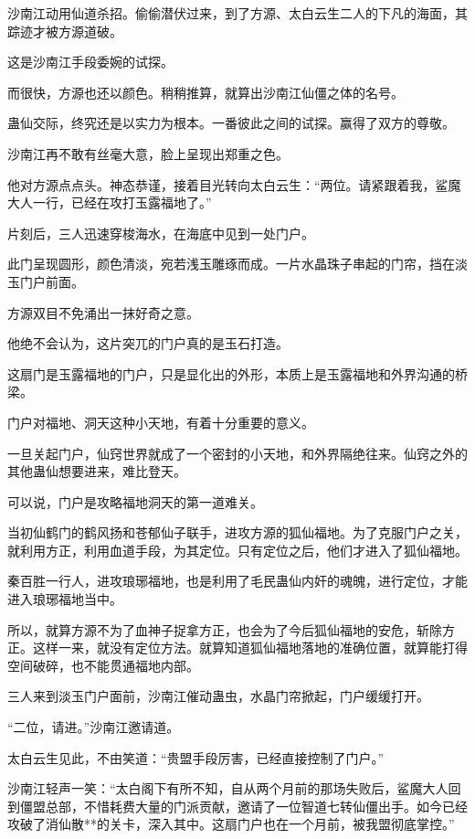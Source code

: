 \begin{this_body}
沙南江动用仙道杀招。偷偷潜伏过来，到了方源、太白云生二人的下凡的海面，其踪迹才被方源道破。

这是沙南江手段委婉的试探。

而很快，方源也还以颜色。稍稍推算，就算出沙南江仙僵之体的名号。

蛊仙交际，终究还是以实力为根本。一番彼此之间的试探。赢得了双方的尊敬。

沙南江再不敢有丝毫大意，脸上呈现出郑重之色。

他对方源点点头。神态恭谨，接着目光转向太白云生：“两位。请紧跟着我，鲨魔大人一行，已经在攻打玉露福地了。”

片刻后，三人迅速穿梭海水，在海底中见到一处门户。

此门呈现圆形，颜色清淡，宛若浅玉雕琢而成。一片水晶珠子串起的门帘，挡在淡玉门户前面。

方源双目不免涌出一抹好奇之意。

他绝不会认为，这片突兀的门户真的是玉石打造。

这扇门是玉露福地的门户，只是显化出的外形，本质上是玉露福地和外界沟通的桥梁。

门户对福地、洞天这种小天地，有着十分重要的意义。

一旦关起门户，仙窍世界就成了一个密封的小天地，和外界隔绝往来。仙窍之外的其他蛊仙想要进来，难比登天。

可以说，门户是攻略福地洞天的第一道难关。

当初仙鹤门的鹤风扬和苍郁仙子联手，进攻方源的狐仙福地。为了克服门户之关，就利用方正，利用血道手段，为其定位。只有定位之后，他们才进入了狐仙福地。

秦百胜一行人，进攻琅琊福地，也是利用了毛民蛊仙内奸的魂魄，进行定位，才能进入琅琊福地当中。

所以，就算方源不为了血神子捉拿方正，也会为了今后狐仙福地的安危，斩除方正。这样一来，就没有定位方法。就算知道狐仙福地落地的准确位置，就算能打得空间破碎，也不能贯通福地内部。

三人来到淡玉门户面前，沙南江催动蛊虫，水晶门帘掀起，门户缓缓打开。

“二位，请进。”沙南江邀请道。

太白云生见此，不由笑道：“贵盟手段厉害，已经直接控制了门户。”

沙南江轻声一笑：“太白阁下有所不知，自从两个月前的那场失败后，鲨魔大人回到僵盟总部，不惜耗费大量的门派贡献，邀请了一位智道七转仙僵出手。如今已经攻破了消仙散**的关卡，深入其中。这扇门户也在一个月前，被我盟彻底掌控。”


\end{this_body}

